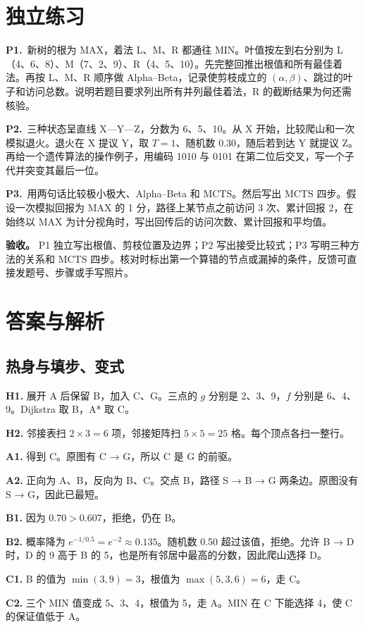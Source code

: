 \documentclass[UTF8,a4paper,11pt]{ctexart}
\newcommand{\CompactQuestion}[2]{\par\noindent\textbf{#1.}\ #2\par\vspace{.8em}}
\begin{document}
\section{独立练习}
\CompactQuestion{P1}{新树的根为 MAX，着法 L、M、R 都通往 MIN。叶值按左到右分别为 L（4、6、8）、M（7、2、9）、R（4、5、10）。先完整回推出根值和所有最佳着法。再按 L、M、R 顺序做 Alpha–Beta，记录使剪枝成立的 $(\alpha,\beta)$、跳过的叶子和访问总数。说明若题目要求列出所有并列最佳着法，R 的截断结果为何还需核验。}
\CompactQuestion{P2}{三种状态呈直线 X—Y—Z，分数为 6、5、10。从 X 开始，比较爬山和一次模拟退火。退火在 X 提议 Y，取 $T=1$、随机数 0.30，随后若到达 Y 就提议 Z。再给一个遗传算法的操作例子，用编码 1010 与 0101 在第二位后交叉，写一个子代并突变其最后一位。}
\CompactQuestion{P3}{用两句话比较极小极大、Alpha–Beta 和 MCTS。然后写出 MCTS 四步。假设一次模拟回报为 MAX 的 1 分，路径上某节点之前访问 3 次、累计回报 2，在始终以 MAX 为计分视角时，写出回传后的访问次数、累计回报和平均值。}
\textbf{验收。} P1 独立写出根值、剪枝位置及边界；P2 写出接受比较式；P3 写明三种方法的关系和 MCTS 四步。核对时标出第一个算错的节点或漏掉的条件，反馈可直接发题号、步骤或手写照片。

\clearpage
\section{答案与解析}
\subsection{热身与填步、变式}
\textbf{H1.} 展开 A 后保留 B，加入 C、G。三点的 $g$ 分别是 2、3、9，$f$ 分别是 6、4、9。Dijkstra 取 B，A* 取 C。

\textbf{H2.} 邻接表扫 $2\times3=6$ 项，邻接矩阵扫 $5\times5=25$ 格。每个顶点各扫一整行。

\textbf{A1.} 得到 C。原图有 C → G，所以 C 是 G 的前驱。

\textbf{A2.} 正向为 A、B，反向为 B、C。交点 B，路径 S → B → G 两条边。原图没有 S → G，因此已最短。

\textbf{B1.} 因为 $0.70>0.607$，拒绝，仍在 B。

\textbf{B2.} 概率降为 $e^{-1/0.5}=e^{-2}\approx0.135$。随机数 0.50 超过该值，拒绝。允许 B → D 时，D 的 9 高于 B 的 5，也是所有邻居中最高的分数，因此爬山选择 D。

\textbf{C1.} B 的值为 $\min(3,9)=3$，根值为 $\max(5,3,6)=6$，走 C。

\textbf{C2.} 三个 MIN 值变成 5、3、4，根值为 5，走 A。MIN 在 C 下能选择 4，使 C 的保证值低于 A。
\end{document}
